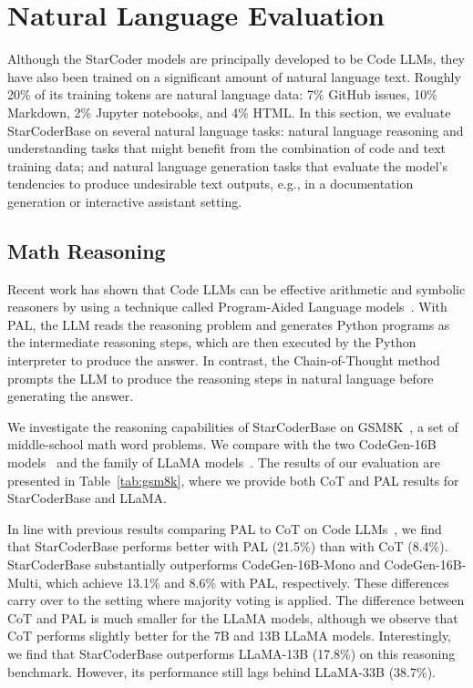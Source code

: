\documentclass[10pt]{article} %
\begin{document}
\section{Natural Language Evaluation}

Although the StarCoder models are principally developed to be Code LLMs, they have also been trained on a significant amount of natural language text. Roughly 20\% of its training tokens are natural language data: 7\% GitHub issues, 10\% Markdown, 2\%  Jupyter notebooks, and 4\% HTML. 
In this section, we evaluate StarCoderBase on several natural language tasks: natural language reasoning and understanding tasks that might benefit from the combination of code and text training data; and natural language generation tasks that evaluate the model's tendencies to produce undesirable text outputs, e.g., in a documentation generation or interactive assistant setting.

\subsection{Math Reasoning}
Recent work has shown that Code LLMs can be effective arithmetic and symbolic reasoners by using a technique called Program-Aided Language models~\citep[PAL;][]{gao2022pal}. With PAL, the LLM reads the reasoning problem and generates Python programs as the intermediate reasoning steps, which are then executed by the Python  interpreter to produce the answer. In contrast, the Chain-of-Thought method~\citep[CoT;][]{wei2022chain} prompts the LLM to produce the reasoning steps in natural language before generating the answer.  

We investigate the reasoning capabilities of StarCoderBase on GSM8K~\citep{cobbe2021training}, a set of middle-school math word problems. We compare with the two CodeGen-16B models~\citep{nijkamp:codegen} and the family of LLaMA models~\citep{touvron2023llama}. The results of our evaluation are presented in Table~\ref{tab:gsm8k}, where we provide both CoT and PAL results for StarCoderBase and LLaMA.

In line with previous results comparing PAL to CoT on Code LLMs~\citep{gao2022pal}, we find that StarCoderBase performs better with PAL (21.5\%) than with CoT (8.4\%). StarCoderBase substantially outperforms CodeGen-16B-Mono and CodeGen-16B-Multi, which achieve 13.1\% and 8.6\% with PAL, respectively. These differences carry over to the setting where majority voting is applied.  The difference between CoT and PAL is much smaller for the LLaMA models, although we observe that CoT performs slightly better for the 7B and 13B LLaMA models. Interestingly, we find that StarCoderBase outperforms LLaMA-13B (17.8\%) on this reasoning benchmark. However, its performance still lags behind LLaMA-33B (38.7\%).   
\end{document}
